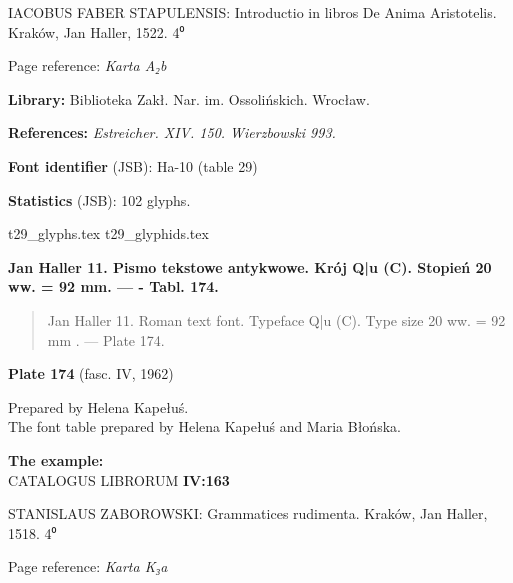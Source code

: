 \documentclass[12pt]{article}
\newcommand{\bg}{\begingl}
\newcommand{\pismoPL}[1]{{\relsize{2}\Junicode\textbf{#1}}}
\newcommand{\pismoEN}[1]{{\relsize{1}\Junicode\begin{quote}#1\end{quote}}}
\newcommand{\plate}[3]{\textbf{Plate #1} (fasc. #2, #3)}
\newcommand{\exampleBib}[1]{{\relsize{2}\Junicode\textbf{The
      example:}\\[2ex] CATALOGUS LIBRORUM \textbf{#1}}}
\newcommand{\exampleDesc}[1]{{\relsize{0}\Junicode#1}}
\newcommand{\exampleDig}[1]{{\relsize{0}\Junicode \textbf{Digitization(s) [JSB]:} #1}}
\newcommand{\exampleLib}[1]{{\relsize{0}\Junicode \textbf{Library:} #1}}
\newcommand{\examplePL}[1]{}
\newcommand{\exampleEN}[1]{}
\newcommand{\fontID}[2]{{\relsize{1}\Junicode\textbf{Font identifier} (JSB): #1 (table #2)}}
\newcommand{\fontstat}[1]{{\relsize{1}\Junicode\textbf{Statistics} (JSB): #1 glyphs.}}
\newcommand{\exampleRef}[1]{{\relsize{0}\Junicode \textbf{References:} #1}}
\newcommand{\examplePage}[1]{{Page reference: \relsize{0}\Junicode#1}}
\begin{document}
\exampleDesc{IACOBUS FABER STAPULENSIS: Introductio in libros De Anima Aristotelis. Kraków, Jan Haller, 1522. 4⁰}
  

\medskip
\examplePage{\textit{Karta A₂b}}

  \bigskip
\exampleLib{Biblioteka Zakł. Nar. im. Ossolińskich. Wrocław.}


\bigskip
\exampleRef{\textit{Estreicher. XIV. 150. Wierzbowski 993.}}


\bigskip

\examplePL{Rubryka \eta{}: z pismem 10.}

    \medskip

    \exampleEN{Rubric \eta{} with font 10.}


\bigskip


\fontID{Ha-10}{29}

\fontstat{102}

  {t29_glyphs.tex}
  {t29_glyphids.tex}

 
 \newpage




  \pismoPL{Jan Haller 11. Pismo tekstowe antykwowe. Krój Q|u (C). Stopień 20 ww. = 92 mm. — - Tabl. 174.}
  
  \pismoEN{Jan Haller 11. Roman text font. Typeface Q|u (C). Type size 20 ww. =
    92 mm . — Plate 174.}

\plate{174}{IV}{1962}

Prepared by Helena Kapełuś.\\
The font table prepared by Helena Kapełuś and Maria Błońska.

\bigskip

\exampleBib{IV:163}

\bigskip


\exampleDesc{STANISLAUS ZABOROWSKI: Grammatices rudimenta. Kraków, Jan Haller, 1518. 4⁰}
  
\medskip
\examplePage{\textit{Karta K₃a}}
\end{document}
